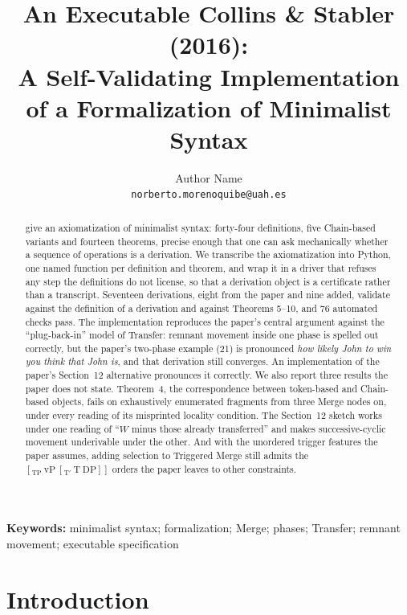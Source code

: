 \documentclass[11pt]{article}
\title{An Executable Collins \& Stabler (2016):\\[2pt]
\large A Self-Validating Implementation of a Formalization of Minimalist Syntax}
\author{Author Name\\
  \texttt{norberto.morenoquibe@uah.es}}
\date{}
\newcommand{\pf}[1]{\textit{#1}}
\theoremstyle{definition}
\theoremstyle{plain}
\begin{document}
\maketitle

\begin{abstract}
\citet{CollinsStabler2016} give an axiomatization of minimalist syntax:
forty-four definitions, five Chain-based variants and fourteen theorems,
precise enough that one can ask mechanically whether a sequence of
operations is a derivation. We transcribe the axiomatization into Python,
one named function per definition and theorem, and wrap it in a driver that
refuses any step the definitions do not license, so that a derivation object
is a certificate rather than a transcript. Seventeen derivations, eight from
the paper and nine added, validate against the definition of a derivation
and against Theorems 5--10, and 76 automated checks pass. The implementation
reproduces the paper's central argument against the ``plug-back-in'' model of
Transfer: remnant movement inside one phase is spelled out correctly, but the
paper's two-phase example (21) is pronounced \pf{how likely John to win you
think that John is}, and that derivation still converges. An implementation
of the paper's Section~12 alternative pronounces it correctly. We also report
three results the paper does not state. Theorem~4, the correspondence between
token-based and Chain-based objects, fails on exhaustively enumerated
fragments from three Merge nodes on, under every reading of its misprinted
locality condition. The Section~12 sketch works under one reading of ``$W$
minus those already transferred'' and makes successive-cyclic movement
underivable under the other. And with the unordered trigger features the
paper assumes, adding selection to Triggered Merge still admits the
$[_{\mathrm{TP}}\ \mathrm{vP}\ [_{\mathrm{T'}}\ \mathrm{T}\ \mathrm{DP}]]$
orders the paper leaves to other constraints.
\end{abstract}

\medskip
\noindent\textbf{Keywords:} minimalist syntax; formalization; Merge;
phases; Transfer; remnant movement; executable specification

\section{Introduction}
\label{sec:intro}
\end{document}
